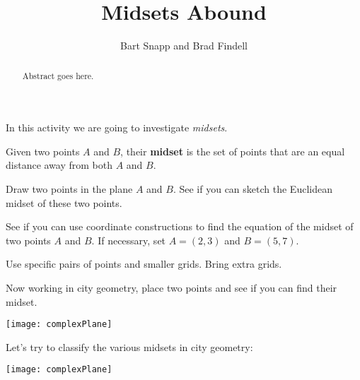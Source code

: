\documentclass{ximera}
\title{Midsets Abound}
\author{Bart Snapp and Brad Findell}
\begin{document}
\begin{abstract}
Abstract goes here.  
\end{abstract}
\maketitle
                                  

In this activity we are going to investigate \textit{midsets}.

\begin{definition}
Given two points $A$ and $B$, their \textbf{midset} is the set of points that are an equal distance away from both $A$ and $B$.
\end{definition}

\begin{problem} 
Draw two points in the plane $A$ and $B$. See if you can sketch the
Euclidean midset of these two points.
\end{problem}

\begin{problem}
See if you can use coordinate constructions to find the equation of
the midset of two points $A$ and $B$. If necessary, set $A = (2,3)$
and $B = (5,7)$.
\end{problem}

\newpage
\begin{teachingnote}
Use specific pairs of points and smaller grids.  Bring extra grids.
\end{teachingnote}  
\begin{problem}
Now working in city geometry, place two points and see if you can find
their midset.
\begin{image}
\texttt{[image: complexPlane]}
\end{image}
\end{problem}

\newpage
\begin{problem}
Let's try to classify the various midsets in city geometry:
\begin{image}
\texttt{[image: complexPlane]}
\end{image}
\end{problem}
\end{document}
